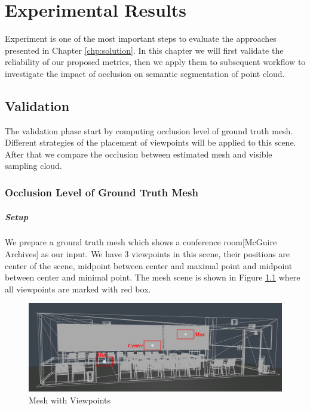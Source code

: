 \documentclass[11pt, a4paper,oneside,chapterprefix=false]{scrbook}
\begin{document}
\chapter{Experimental Results} \label{chp:experimental results}

Experiment is one of the most important steps to evaluate the approaches presented in Chapter \ref{chp:solution}. In this chapter we will first validate the reliability of our proposed metrics, then we apply them to subsequent workflow to investigate the impact of occlusion on semantic segmentation of point cloud.

\section{Validation}

The validation phase start by computing occlusion level of ground truth mesh. Different strategies of the placement of viewpoints will be applied to this scene. After that we compare the occlusion between estimated mesh and visible sampling cloud.

\subsection{Occlusion Level of Ground Truth Mesh} \label{exp:occlusion of ground truth mesh}

\paragraph{Setup}

We prepare a ground truth mesh which shows a conference room[McGuire Archives] as our input. We have 3 viewpoints in this scene, their positions are center of the scene, midpoint between center and maximal point and midpoint between center and minimal point. The mesh scene is shown in Figure \ref{fig:mesh with viewpoints} where all viewpoints are marked with red box. 

\vspace{20pt}

\begin{figure}[H]
    \centering
    \includegraphics*[width=1.0\textwidth]{figures/mesh with vps.png}
    \caption{Mesh with Viewpoints}
    \label{fig:mesh with viewpoints}
\end{figure}
\end{document}
